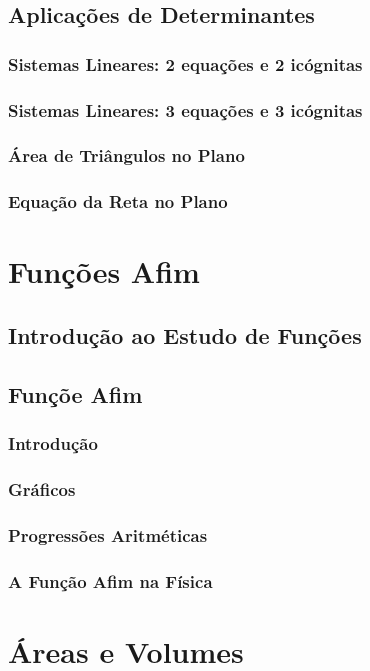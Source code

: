 \documentclass[12pt,a4paper]{book}
\begin{document}
	\section{Aplicações de Determinantes}
		\subsection{Sistemas Lineares: 2 equações e 2 icógnitas}
		\subsection{Sistemas Lineares: 3 equações e 3 icógnitas}
		\subsection{Área de Triângulos no Plano}
		\subsection{Equação da Reta no Plano}
		
\chapter{Funções Afim}

	\section{Introdução ao Estudo de Funções}	
	\section{Funçõe Afim}
		\subsection{Introdução}
		\subsection{Gráficos}
		\subsection{Progressões Aritméticas}
		\subsection{A Função Afim na Física}

\chapter{Áreas e Volumes}
\end{document}
